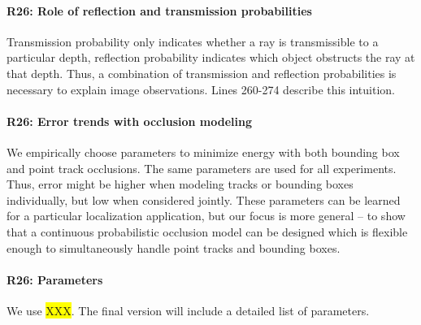 \documentclass[10pt,twocolumn,letterpaper]{article}
\newcommand{\hili}[1]{\colorbox{yellow}{#1}}
\begin{document}
\vspace{-0.4cm}
\paragraph{R26: Role of reflection and transmission probabilities}
Transmission probability only indicates whether a ray is transmissible to a particular depth, reflection probability indicates which object obstructs the ray at that depth. Thus, a combination of transmission and reflection probabilities is necessary to explain image observations. Lines 260-274 describe this intuition.


\vspace{-0.4cm}
\paragraph{R26: Error trends with occlusion modeling}
We empirically choose parameters to minimize energy with both bounding box and point track occlusions. The same parameters are used for all experiments. Thus, error might be higher when modeling tracks or bounding boxes individually, but low when considered jointly. These parameters can be learned for a particular localization application, but our focus is more general -- to show that a continuous probabilistic occlusion model can be designed which is flexible enough to simultaneously handle point tracks and bounding boxes.

\vspace{-0.4cm}
\paragraph{R26: Parameters}
We use \hili{XXX}. The final version will include a detailed list of parameters.



\end{document}
